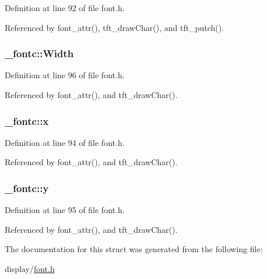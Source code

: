 Definition at line 92 of file font.\-h.



Referenced by font\-\_\-attr(), tft\-\_\-draw\-Char(), and tft\-\_\-putch().

\hypertarget{struct__fontc_ae3c802e1c35ae9a4e37c8eb2e9644325}{
\subsubsection[{Width}]{ \-\_\-fontc\-::\-Width}}\label{struct__fontc_ae3c802e1c35ae9a4e37c8eb2e9644325}


Definition at line 96 of file font.\-h.



Referenced by font\-\_\-attr(), and tft\-\_\-draw\-Char().

\hypertarget{struct__fontc_ad15d00ed46ebe52a085cf05b5ca5da90}{
\subsubsection[{x}]{ \-\_\-fontc\-::x}}\label{struct__fontc_ad15d00ed46ebe52a085cf05b5ca5da90}


Definition at line 94 of file font.\-h.



Referenced by font\-\_\-attr(), and tft\-\_\-draw\-Char().

\hypertarget{struct__fontc_aebbde0dc41068722ee1a69f4a56478a4}{
\subsubsection[{y}]{ \-\_\-fontc\-::y}}\label{struct__fontc_aebbde0dc41068722ee1a69f4a56478a4}


Definition at line 95 of file font.\-h.



Referenced by font\-\_\-attr(), and tft\-\_\-draw\-Char().



The documentation for this struct was generated from the following file\-:\begin{DoxyCompactItemize}
\item 
display/\hyperlink{display_2font_8h}{font.\-h}\end{DoxyCompactItemize}
